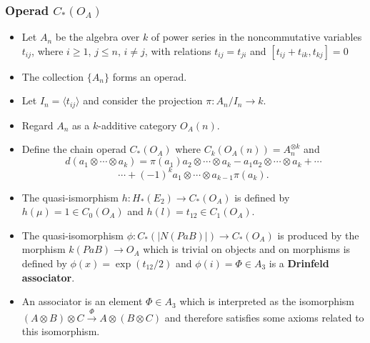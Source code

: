 \documentclass{beamer}
\theoremstyle{definition}
\newcommand{\Q}{\mathbb{Q}}
\providecommand{\gene}[1]{\langle{#1}\rangle}
\begin{document}
 
\begin{frame}
	\frametitle{Operad $C_*(O_A)$}
	\begin{itemize}
		\item<1-> Let $A_n$ be the algebra over $k$ of power series in the noncommutative variables $t_{ij}$, where $i\geq 1$, $j\leq n$, $i\neq j$, with relations $t_{ij}=t_{ji}$ and $[t_{ij}+t_{ik},t_{kj}]=0$
		\item<2-> The collection $\{A_n\}$ forms an operad. 
		\item<3-> Let $I_n=\gene{t_{ij}}$ and consider the projection $\pi:A_n/I_n\to k$. 
		\item<4-> Regard $A_n$ as a $k$-additive category $O_{A}(n)$. 
	\end{itemize}
\end{frame}
\begin{frame}
	\begin{itemize}
		\item<1-> %
		Define the chain operad $C_*(O_A)$ where $C_k(O_A(n))=A_n^{\otimes k}$ and
		$$
		d(a_1\otimes\cdots\otimes a_k)=\pi(a_1)a_2\otimes\cdots\otimes a_k-a_1a_2\otimes \cdots\otimes a_k+\cdots$$ $$\cdots+(-1)^{k}a_1\otimes\cdots\otimes a_{k-1}\pi(a_k).$$ %
		
		\item<2-> The quasi-ismorphism $h:H_*(E_2)\to C_*(O_A)$ is defined by $h(\mu)=1\in C_0(O_A)$ and $h(l)=t_{12}\in C_1(O_A)$. %
		\item<3-> The quasi-isomorphism $\phi:C_*(|N(PaB)|)\to C_*(O_A)$ is produced by the morphism $k(PaB)\to O_A$ which is trivial on objects and on morphisms is defined by $\phi(x)=\exp(t_{12}/2)$ and $\phi(i)=\Phi\in A_3$ is a \textbf{Drinfeld associator}.  %
		\item<4-> An associator is an element $\Phi\in A_3$ which is interpreted as the isomorphism $(A\otimes B)\otimes C\xrightarrow{\Phi} A\otimes (B\otimes C)$ and therefore satisfies some axioms related to this isomorphism. %
	\end{itemize}
\end{frame}
\end{document}
